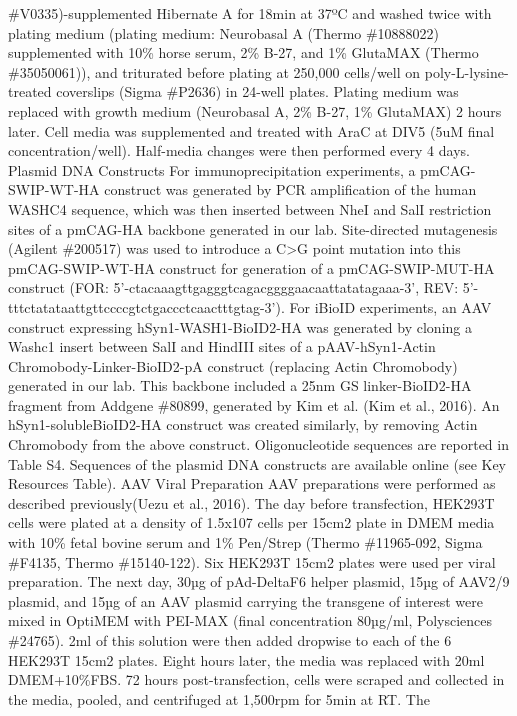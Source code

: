 \#V0335)-supplemented Hibernate A for 18min at 37ºC and washed twice with plating
medium (plating medium: Neurobasal A (Thermo \#10888022) supplemented with 10\%
horse serum, 2\% B-27, and 1\% GlutaMAX (Thermo \#35050061)), and triturated before
plating at 250,000 cells/well on poly-L-lysine-treated coverslips (Sigma \#P2636)
in 24-well plates. Plating medium was replaced with growth medium (Neurobasal A,
2\% B-27, 1\% GlutaMAX) 2 hours later. Cell media was supplemented and treated
with AraC at DIV5 (5uM final concentration/well). Half-media changes were then
performed every 4 days. 
Plasmid DNA Constructs
	For immunoprecipitation experiments, a pmCAG-SWIP-WT-HA construct was
generated by PCR amplification of the human WASHC4 sequence, which was then
inserted between NheI and SalI restriction sites of a pmCAG-HA backbone
generated in our lab. Site-directed mutagenesis (Agilent \#200517) was used to
introduce a C>G point mutation into this pmCAG-SWIP-WT-HA construct for
generation of a pmCAG-SWIP-MUT-HA construct (FOR:
5'-ctacaaagttgagggtcagacggggaacaattatatagaaa-3', REV:
5'-tttctatataattgttccccgtctgaccctcaactttgtag-3’). For iBioID experiments, an AAV
construct expressing hSyn1-WASH1-BioID2-HA was generated by cloning a Washc1
insert between SalI and HindIII sites of a pAAV-hSyn1-Actin
Chromobody-Linker-BioID2-pA construct (replacing Actin Chromobody) generated in
our lab. This backbone included a 25nm GS linker-BioID2-HA fragment from Addgene
\#80899, generated by Kim et al. (Kim et al., 2016). An hSyn1-solubleBioID2-HA
construct was created similarly, by removing Actin Chromobody from the above
construct. Oligonucleotide sequences are reported in Table S4. Sequences of the
plasmid DNA constructs are available online (see Key Resources Table). 
AAV Viral Preparation
AAV preparations were performed as described previously(Uezu et al., 2016). The
day before transfection, HEK293T cells were plated at a density of 1.5x107 cells
per 15cm2 plate in DMEM media with 10\% fetal bovine serum and 1\% Pen/Strep
(Thermo \#11965-092, Sigma \#F4135, Thermo \#15140-122). Six HEK293T 15cm2 plates
were used per viral preparation. The next day, 30µg of pAd-DeltaF6 helper
plasmid, 15µg of AAV2/9 plasmid, and 15µg of an AAV plasmid carrying the
transgene of interest were mixed in OptiMEM with PEI-MAX (final concentration
80µg/ml, Polysciences \#24765). 2ml of this solution were then added dropwise to
each of the 6 HEK293T 15cm2 plates. Eight hours later, the media was replaced
with 20ml DMEM+10\%FBS. 72 hours post-transfection, cells were scraped and
collected in the media, pooled, and centrifuged at 1,500rpm for 5min at RT. The
